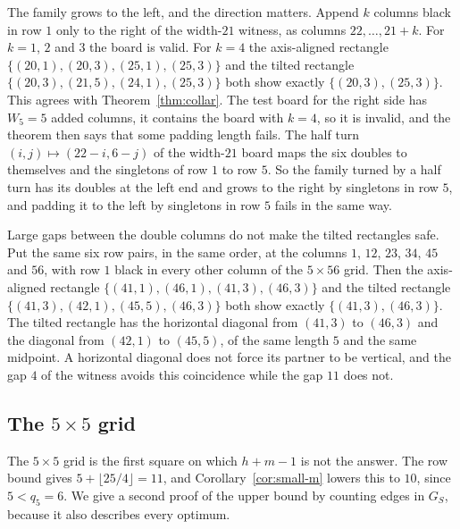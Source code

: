 \begin{remark}\label{rem:rightpad}
The family grows to the left, and the direction matters. Append $k$ columns black in row $1$
only to the right of the width-$21$ witness, as columns $22,\dots,21+k$. For $k=1$, $2$ and $3$
the board is valid. For $k=4$ the axis-aligned rectangle $\{(20,1),(20,3),(25,1),(25,3)\}$
and the tilted rectangle $\{(20,3),(21,5),(24,1),(25,3)\}$ both show exactly
$\{(20,3),(25,3)\}$. This agrees with Theorem~\ref{thm:collar}. The test board for the right
side has $W_5=5$ added columns, it contains the board with $k=4$, so it is invalid, and the
theorem then says that some padding length fails. The half turn $(i,j)\mapsto(22-i,6-j)$ of
the width-$21$ board maps the six doubles to themselves and the singletons of row $1$ to
row $5$. So the family turned by a half turn has its doubles at the left end and grows to the
right by singletons in row $5$, and padding it to the left by singletons in row $5$ fails in the
same way.
\end{remark}

\begin{remark}\label{rem:spacing}
Large gaps between the double columns do not make the tilted rectangles safe. Put the same six
row pairs, in the same order, at the columns $1$, $12$, $23$, $34$, $45$ and $56$, with row
$1$ black in every other column of the $5\times56$ grid. Then the axis-aligned rectangle
$\{(41,1),(46,1),(41,3),(46,3)\}$ and the tilted rectangle
$\{(41,3),(42,1),(45,5),(46,3)\}$ both show exactly $\{(41,3),(46,3)\}$. The tilted rectangle
has the horizontal diagonal from $(41,3)$ to $(46,3)$ and the diagonal from $(42,1)$ to
$(45,5)$, of the same length $5$ and the same midpoint. A horizontal diagonal does not force
its partner to be vertical, and the gap $4$ of the witness avoids this coincidence while the
gap $11$ does not.
\end{remark}

\subsection{The \texorpdfstring{$5\times5$}{5 x 5} grid}

The $5\times5$ grid is the first square on which $h+m-1$ is not the answer. The row bound
gives $5+\lfloor25/4\rfloor=11$, and Corollary~\ref{cor:small-m} lowers this to $10$, since
$5<q_5=6$. We give a second proof of the upper bound by counting edges in $G_S$, because it
also describes every optimum.

